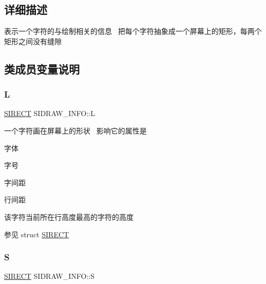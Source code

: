 \subsection{详细描述}
表示一个字符的与绘制相关的信息~\newline
把每个字符抽象成一个屏幕上的矩形，每两个矩形之间没有缝隙 

\subsection{类成员变量说明}
\mbox{\label{class_s_i_d_r_a_w___i_n_f_o_a41065961d296d245790773771670aae2}} 
\subsubsection{\texorpdfstring{L}{L}}
{\footnotesize\ttfamily \hyperlink{struct_s_i_r_e_c_t}{S\+I\+R\+E\+CT} S\+I\+D\+R\+A\+W\+\_\+\+I\+N\+F\+O\+::L}



一个字符画在屏幕上的形状~\newline
影响它的属性是~\newline



\begin{DoxyItemize}
\item 字体
\item 字号
\item 字间距
\item 行间距
\item 该字符当前所在行高度最高的字符的高度 \begin{DoxySeeAlso}{参见}
struct \hyperlink{struct_s_i_r_e_c_t}{S\+I\+R\+E\+CT} 
\end{DoxySeeAlso}

\end{DoxyItemize}\mbox{\label{class_s_i_d_r_a_w___i_n_f_o_a495fac5bcc54e4b58d500a7117fde9d9}} 
\subsubsection{\texorpdfstring{S}{S}}
{\footnotesize\ttfamily \hyperlink{struct_s_i_r_e_c_t}{S\+I\+R\+E\+CT} S\+I\+D\+R\+A\+W\+\_\+\+I\+N\+F\+O\+::S}



